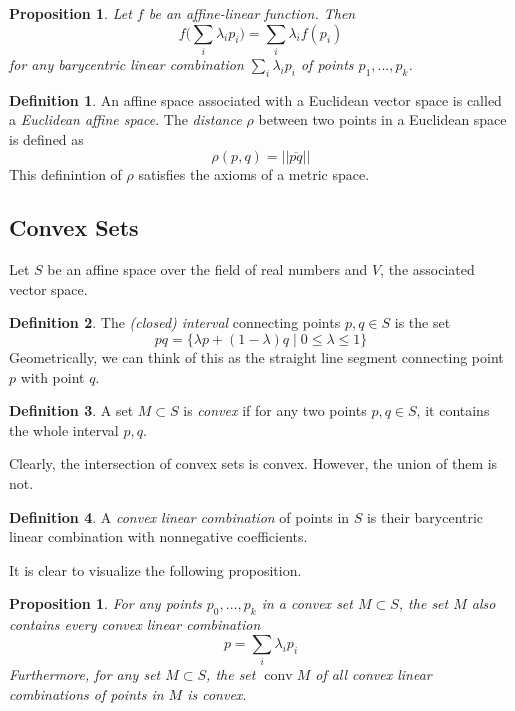 \documentclass{article}
\DeclareMathOperator{\conv}{conv}
\newtheorem{proposition}[theorem]{Proposition}
\theoremstyle{remark}
\theoremstyle{definition}
\newtheorem{definition}{Definition}[section]
\begin{document}
\begin{proposition}
Let $f$ be an affine-linear function. Then
\[f \bigg( \sum_i \lambda_i p_i \bigg) = \sum_i \lambda_i f(p_i)\]
for any barycentric linear combination $\sum_i \lambda_i p_i$ of points $p_1, ..., p_k$. 
\end{proposition}

\begin{definition}
An affine space associated with a Euclidean vector space is called a \textit{Euclidean affine space}. The \textit{distance $\rho$} between two points in a Euclidean space is defined as
\[\rho(p, q) = ||\overline{pq}||\]
This definintion of $\rho$ satisfies the axioms of a metric space. 
\end{definition}

\subsection{Convex Sets}
Let $S$ be an affine space over the field of real numbers and $V$, the associated vector space. 

\begin{definition}
The \textit{(closed) interval} connecting points $p, q \in S$ is the set
\[pq = \{\lambda p + (1-\lambda) q \;|\; 0 \leq \lambda \leq 1\}\]
Geometrically, we can think of this as the straight line segment connecting point $p$ with point $q$. 
\end{definition}

\begin{definition}
A set $M \subset S$ is \textit{convex} if for any two points $p, q \in S$, it contains the whole interval $p, q$. 
\end{definition}

Clearly, the intersection of convex sets is convex. However, the union of them is not. 

\begin{definition}
A \textit{convex linear combination} of points in $S$ is their barycentric linear combination with nonnegative coefficients. 
\end{definition}

It is clear to visualize the following proposition. 

\begin{proposition}
For any points $p_0, ..., p_k$ in a convex set $M \subset S$, the set $M$ also contains every convex linear combination 
\[p = \sum_i \lambda_i p_i\]
Furthermore, for any set $M \subset S$, the set $\conv{M}$ of all convex linear combinations of points in $M$ is convex. 
\end{proposition}
\end{document}
